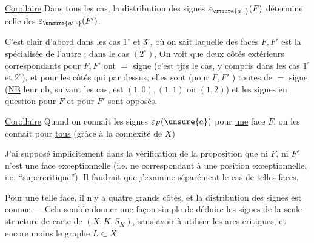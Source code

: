 \uline{Corollaire} Dans tous les cas, la distribution des signes \(\varepsilon_{\unsure{a|\cdot}}(F)\) détermine celle des \(\varepsilon_{\unsure{a'|\cdot}}(F')\). 

C'est clair d'abord dans les cas \(1^\circ\) et \(3^\circ\), où on sait laquelle des faces \(F,F'\) est la spécialisée de l'autre ;  dans le cas \((2^\circ)\),  On voit que  deux côtés extérieurs correspondants pour \(F,F'\) ont $=$ \uline{signe} (c'est tjrs le cas, y compris dans les cas \(1^\circ\) et \(2^\circ\)), et pour les côtés qui  par dessus, elles sont (pour \(F,F'\) ) toutes de $=$ signe (\uline{NB} leur nb, suivant les cas, est \((1,0),(1,1)\) ou \((1,2)\)) et les signes en question pour \(F\) et pour \(F'\) sont opposés.

\uline{Corollaire} Quand on connaît les signes \(\varepsilon_F(\unsure{a})\) pour \uline{une} face \(F\), on les connaît pour \uline{tous} (grâce à la connexité de \(X\))

J'ai supposé implicitement  dans la vérification de la proposition que ni \(F\), ni \(F'\) n'est une face exceptionnelle (i.e. ne correspondant à une position  exceptionnelle, i.e. ``supercritique''). Il faudrait que j'examine séparément le cas de telles faces.

Pour une telle face, il n'y a  quatre grands côtés, et la distribution des signes est connue --- Cela semble donner une façon simple de déduire les signes de la seule structure de carte de \((X,K,S_K)\), sans avoir à utiliser les arcs critiques, et encore moins  le  graphe \(L\subset X\).
